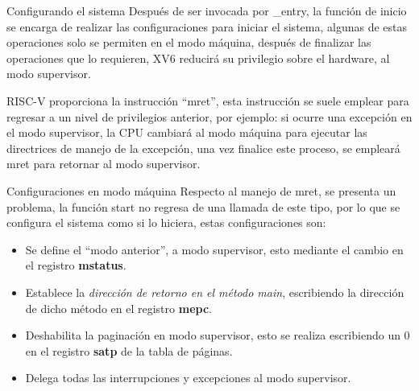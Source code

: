 \documentclass{libs/ufc_format}
\begin{document}
\begin{frame}{Configurando el sistema}
    Después de ser invocada por \_entry, la función de inicio se encarga de realizar las configuraciones para iniciar el sistema, algunas de estas operaciones solo se permiten en el modo máquina, después de finalizar las operaciones que lo requieren, XV6 reducirá su privilegio sobre el hardware, al modo supervisor. 

    \vspace{0.4cm}

    RISC-V proporciona la instrucción “mret”, esta instrucción se suele emplear para regresar a un nivel de privilegios anterior, por ejemplo: si ocurre una excepción en el modo supervisor, la CPU cambiará al modo máquina para ejecutar las directrices de manejo de la excepción, una vez finalice este proceso, se empleará mret para retornar al modo supervisor.
\end{frame}
\begin{frame}{Configuraciones en modo máquina}
    Respecto al manejo de mret, se presenta un problema, la función start no regresa de una llamada de este tipo, por lo que se configura el sistema como si lo hiciera, estas configuraciones son:

    \vspace{0.3cm}

    \begin{itemize}
        \item Se define el “modo anterior”, a modo supervisor, esto mediante el cambio en el registro \textbf{mstatus}.
        \item Establece la \emph{dirección de retorno en el método main}, escribiendo la dirección de dicho método en el registro \textbf{mepc}.
        \item  Deshabilita la paginación en modo supervisor, esto se realiza escribiendo un 0 en el registro \textbf{satp} de la tabla de páginas.
        \item Delega todas las interrupciones y excepciones al modo supervisor.
    \end{itemize}
\end{frame}
\end{document}
